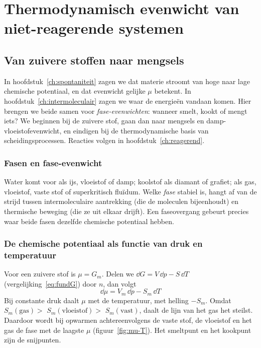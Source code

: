 \chapter{Thermodynamisch evenwicht van niet-reagerende systemen}
\label{ch:niet-reagerend}

\section{Van zuivere stoffen naar mengsels}

In hoofdstuk~\ref{ch:spontaniteit} zagen we dat materie stroomt van hoge naar lage chemische potentiaal, en dat evenwicht gelijke $\mu$ betekent. In hoofdstuk~\ref{ch:intermoleculair} zagen we waar de energie\"en vandaan komen. Hier brengen we beide samen voor \emph{fase-evenwichten}: wanneer smelt, kookt of mengt iets? We beginnen bij de zuivere stof, gaan dan naar mengsels en damp-vloeistofevenwicht, en eindigen bij de thermodynamische basis van scheidingsprocessen. Reacties volgen in hoofdstuk~\ref{ch:reagerend}.

\subsection{Fasen en fase-evenwicht}
\label{sec:fasen-evenwicht}

Water komt voor als ijs, vloeistof of damp; koolstof als diamant of grafiet;  als gas, vloeistof, vaste stof of superkritisch flu\"idum. Welke \emph{fase} stabiel is, hangt af van de strijd tussen intermoleculaire aantrekking (die de moleculen bijeenhoudt) en thermische beweging (die ze uit elkaar drijft). Een faseovergang gebeurt precies waar beide fasen dezelfde chemische potentiaal hebben.

\subsection{De chemische potentiaal als functie van druk en temperatuur}
\label{sec:mu-p-T}

Voor een zuivere stof is $\mu = G_m$. Delen we $\dd G = V\,\dd p - S\,\dd T$ (vergelijking~\eqref{eq:fundG}) door $n$, dan volgt
\begin{equation}
\boxed{\;\dd{\mu} = V_m\,\dd{p} - S_m\,\dd{T}\;}
\label{eq:dmu-fundamenteel}
\end{equation}
Bij constante druk daalt $\mu$ met de temperatuur, met helling $-S_m$. Omdat $S_m(\text{gas}) > {}$ $S_m(\text{vloeistof}) > {}$ $S_m(\text{vast})$, daalt de lijn van het gas het steilst. Daardoor wordt bij opwarmen achtereenvolgens de vaste stof, de vloeistof en het gas de fase met de laagste $\mu$ (figuur~\ref{fig:mu-T}). Het smeltpunt en het kookpunt zijn de snijpunten.


